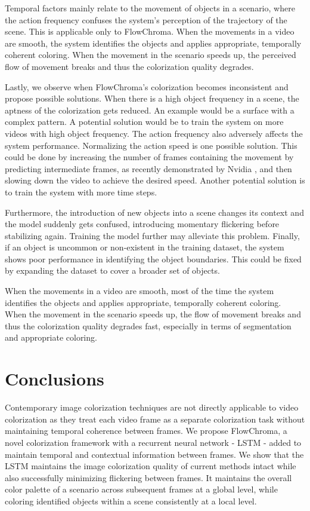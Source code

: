 \documentclass[10pt,twocolumn,letterpaper]{article}
\begin{document}
Temporal factors mainly relate to the movement of objects in a scenario, where the action frequency confuses the system's perception of the trajectory of the scene. This is applicable only to FlowChroma. When the movements in a video are smooth, the system identifies the objects and applies appropriate, temporally coherent coloring. When the movement in the scenario speeds up, the perceived flow of movement breaks and thus the colorization quality degrades.

Lastly, we observe when FlowChroma’s colorization becomes inconsistent and propose possible solutions. When there is a high object frequency in a scene, the aptness of the colorization gets reduced. An example would be a surface with a complex pattern. A potential solution would be to train the system on more videos with high object frequency. The action frequency also adversely affects the system performance. Normalizing the action speed is one possible solution. This could be done by increasing the number of frames containing the movement by predicting intermediate frames, as recently demonstrated by Nvidia \cite{DBLP:journals/corr/abs-1712-00080}, and then slowing down the video to achieve the desired speed. Another potential solution is to train the system with more time steps. 

Furthermore, the introduction of new objects into a scene changes its context and the model suddenly gets confused, introducing momentary flickering before stabilizing again. Training the model further may alleviate this problem. Finally, if an object is uncommon or non-existent in the training dataset, the system shows poor performance in identifying the object boundaries. This could be fixed by expanding the dataset to cover a broader set of objects.


When the movements in a video are smooth, most of the time the system identifies the objects and applies appropriate, temporally coherent coloring. When the movement in the scenario speeds up, the flow of movement breaks and thus the colorization quality degrades fast, especially in terms of segmentation and appropriate coloring.

\section{Conclusions}

Contemporary image colorization techniques are not directly applicable to video colorization as they treat each video frame as a separate colorization task without maintaining temporal coherence between frames. We propose FlowChroma, a novel colorization framework with a recurrent neural network - LSTM - added to maintain temporal and contextual information between frames. We show that the LSTM maintains the image colorization quality of current methods intact while also successfully minimizing flickering between frames. It maintains the overall color palette of a scenario across subsequent frames at a global level, while coloring identified objects within a scene consistently at a local level. 
\end{document}
